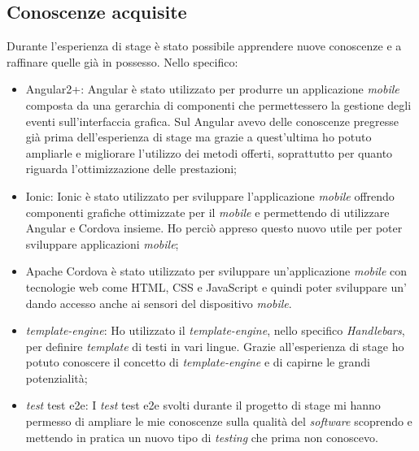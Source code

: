 \subsection{Conoscenze acquisite}
Durante l'esperienza di stage è stato possibile apprendere nuove conoscenze e a raffinare quelle già in possesso. Nello specifico:
\begin{itemize}
	\item {} Angular2+: Angular è stato utilizzato per produrre un applicazione \emph{mobile} composta da una gerarchia di componenti che permettessero la gestione degli eventi sull'interfaccia grafica. Sul  Angular avevo delle conoscenze pregresse già prima dell'esperienza di stage ma grazie a quest'ultima ho potuto ampliarle e migliorare l'utilizzo dei metodi offerti, soprattutto per quanto riguarda l'ottimizzazione delle prestazioni;
	\item {} Ionic: Ionic è stato utilizzato per sviluppare l'applicazione \emph{mobile} offrendo componenti grafiche ottimizzate per il \emph{mobile} e permettendo di utilizzare Angular e Cordova insieme. Ho perciò appreso questo nuovo  utile per poter sviluppare applicazioni \emph{mobile};
	\item  {} Apache Cordova è stato utilizzato per sviluppare un'applicazione \emph{mobile} con tecnologie web come \gls{HTML}, \gls{CSS} e JavaScript e quindi poter sviluppare un'  dando accesso anche ai sensori del dispositivo \emph{mobile}.
	\item \emph{template-engine}: Ho utilizzato il \emph{template-engine}, nello specifico \emph{Handlebars}, per definire \emph{template} di testi in vari lingue. Grazie all'esperienza di stage ho potuto conoscere il concetto di \emph{template-engine} e di capirne le grandi potenzialità;
	\item \emph{test} \gls{test e2e}: I \emph{test} \gls{test e2e} svolti durante il progetto di stage mi hanno permesso di ampliare le mie conoscenze sulla qualità del \emph{software} scoprendo e mettendo in pratica un nuovo tipo di \emph{testing} che prima non conoscevo.
\end{itemize}
